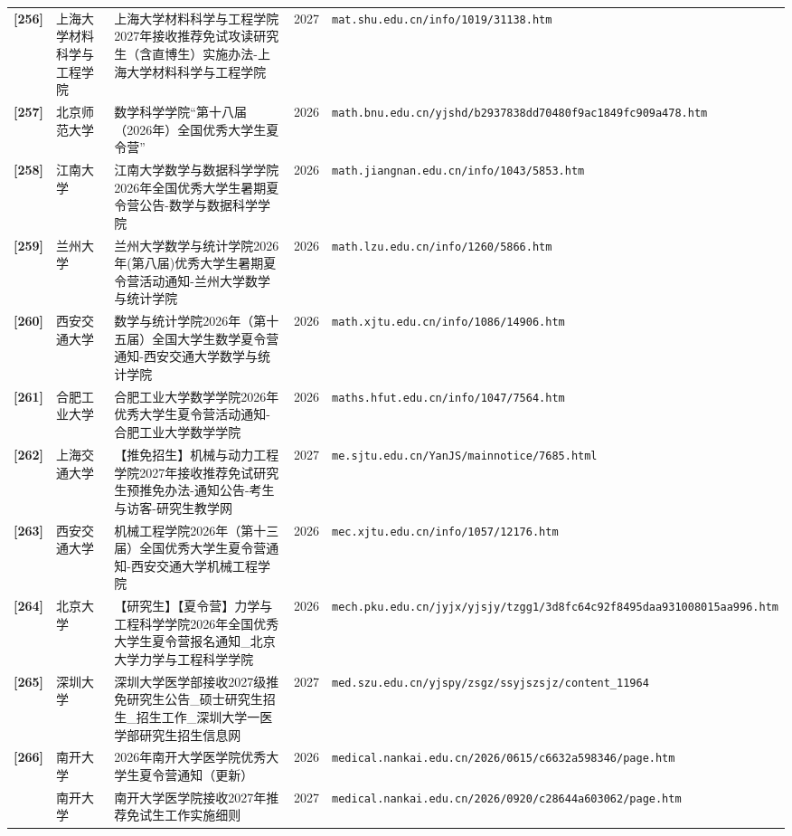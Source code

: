 {\begin{longtable}{@{}p{1.15cm}p{2.9cm}p{6.3cm}p{0.85cm}p{5.0cm}@{}}
\textbf{[256]} & 上海大学材料科学与工程学院 & 上海大学材料科学与工程学院2027年接收推荐免试攻读研究生（含直博生）实施办法-上海大学材料科学与工程学院 & 2027 & \texttt{mat.shu.edu.cn/info/1019/31138.htm} \\
\textbf{[257]} & 北京师范大学 & 数学科学学院“第十八届（2026年）全国优秀大学生夏令营” & 2026 & \texttt{math.bnu.edu.cn/yjshd/b2937838dd70480f9ac1849fc909a478.htm} \\
\textbf{[258]} & 江南大学 & 江南大学数学与数据科学学院2026年全国优秀大学生暑期夏令营公告-数学与数据科学学院 & 2026 & \texttt{math.jiangnan.edu.cn/info/1043/5853.htm} \\
\textbf{[259]} & 兰州大学 & 兰州大学数学与统计学院2026年(第八届)优秀大学生暑期夏令营活动通知-兰州大学数学与统计学院 & 2026 & \texttt{math.lzu.edu.cn/info/1260/5866.htm} \\
\textbf{[260]} & 西安交通大学 & 数学与统计学院2026年（第十五届）全国大学生数学夏令营通知-西安交通大学数学与统计学院 & 2026 & \texttt{math.xjtu.edu.cn/info/1086/14906.htm} \\
\textbf{[261]} & 合肥工业大学 & 合肥工业大学数学学院2026年优秀大学生夏令营活动通知-合肥工业大学数学学院 & 2026 & \texttt{maths.hfut.edu.cn/info/1047/7564.htm} \\
\textbf{[262]} & 上海交通大学 & 【推免招生】机械与动力工程学院2027年接收推荐免试研究生预推免办法-通知公告-考生与访客-研究生教学网 & 2027 & \texttt{me.sjtu.edu.cn/YanJS/mainnotice/7685.html} \\
\textbf{[263]} & 西安交通大学 & 机械工程学院2026年（第十三届）全国优秀大学生夏令营通知-西安交通大学机械工程学院 & 2026 & \texttt{mec.xjtu.edu.cn/info/1057/12176.htm} \\
\textbf{[264]} & 北京大学 & 【研究生】【夏令营】力学与工程科学学院2026年全国优秀大学生夏令营报名通知\_北京大学力学与工程科学学院 & 2026 & \texttt{mech.pku.edu.cn/jyjx/yjsjy/tzgg1/3d8fc64c92f8495daa931008015aa996.htm} \\
\textbf{[265]} & 深圳大学 & 深圳大学医学部接收2027级推免研究生公告\_硕士研究生招生\_招生工作\_深圳大学一医学部研究生招生信息网 & 2027 & \texttt{med.szu.edu.cn/yjspy/zsgz/ssyjszsjz/content\_11964} \\
\textbf{[266]} & 南开大学 & 2026年南开大学医学院优秀大学生夏令营通知（更新） & 2026 & \texttt{medical.nankai.edu.cn/2026/0615/c6632a598346/page.htm} \\
[267] & 南开大学 & 南开大学医学院接收2027年推荐免试生工作实施细则 & 2027 & \texttt{medical.nankai.edu.cn/2026/0920/c28644a603062/page.htm} \\

\end{longtable}}
